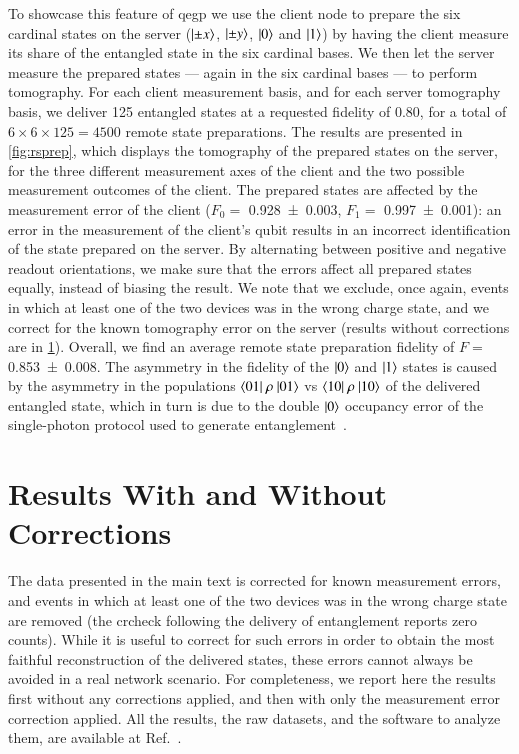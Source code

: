 To showcase this feature of \acrshort{qegp} we use the client node to prepare the six cardinal
states on the server ($\ket{\pm x}$, $\ket{\pm y}$, $\ket{0}$ and $\ket{1}$) by having the client
measure its share of the entangled state in the six cardinal bases. We then let the server measure
the prepared states --- again in the six cardinal bases --- to perform tomography. For each client
measurement basis, and for each server tomography basis, we deliver \num{125} entangled states at a
requested fidelity of \num{0.80}, for a total of $6 \times 6 \times 125 = 4500$ remote state
preparations. The results are presented in \cref{fig:rsprep}, which displays the tomography of the
prepared states on the server, for the three different measurement axes of the client and the two
possible measurement outcomes of the client. The prepared states are affected by the measurement
error of the client ($F_0 =$ \num{0.928(3)}, $F_1 = $ \num{0.997(1)}): an error in the measurement
of the client's qubit results in an incorrect identification of the state prepared on the server. By
alternating between positive and negative readout orientations, we make sure that the errors affect
all prepared states equally, instead of biasing the result. We note that we exclude, once again,
events in which at least one of the two devices was in the wrong charge state, and we correct for
the known tomography error on the server (results without corrections are in
\cref{sec:netstack:corrections}). Overall, we find an average remote state preparation fidelity of
$F =$ \num{0.853(8)}. The asymmetry in the fidelity of the $\ket{0}$ and $\ket{1}$ states is caused
by the asymmetry in the populations $\braket{01|\ \rho\ |01}$ vs $\braket{10|\ \rho\ |10}$ of the
delivered entangled state, which in turn is due to the double $\ket{0}$ occupancy error of the
single-photon protocol used to generate entanglement~\cite{humphreys_2018_delivery,
pompili_2021_multinode}.

\section{Results With and Without Corrections}
\label{sec:netstack:corrections}

The data presented in the main text is corrected for known measurement errors, and events in which
at least one of the two devices was in the wrong charge state are removed (the \acrshort{crcheck}
following the delivery of entanglement reports zero counts). While it is useful to correct for such
errors in order to obtain the most faithful reconstruction of the delivered states, these errors
cannot always be avoided in a real network scenario. For completeness, we report here the results
first without any corrections applied, and then with only the measurement error correction applied.
All the results, the raw datasets, and the software to analyze them, are available at
Ref.~\cite{link_layer_data}.

